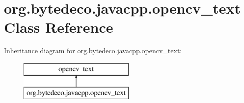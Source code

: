 \hypertarget{classorg_1_1bytedeco_1_1javacpp_1_1opencv__text}{}\section{org.\+bytedeco.\+javacpp.\+opencv\+\_\+text Class Reference}
\label{classorg_1_1bytedeco_1_1javacpp_1_1opencv__text}
Inheritance diagram for org.\+bytedeco.\+javacpp.\+opencv\+\_\+text\+:\begin{figure}[H]
\begin{center}
\leavevmode
\includegraphics[height=2.000000cm]{classorg_1_1bytedeco_1_1javacpp_1_1opencv__text}
\end{center}
\end{figure}
